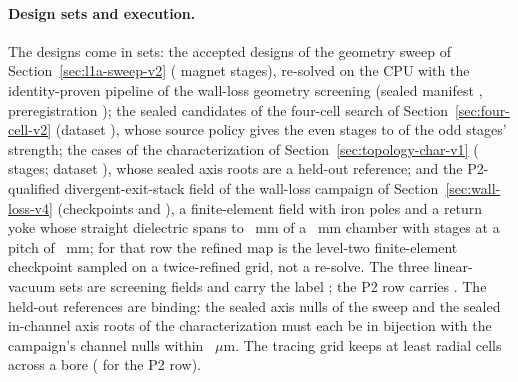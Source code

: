 \paragraph{Design sets and execution.}
The \CtvDesignCount{} designs come in \CtvSetCount{} sets: the
\CtvSweepCount{} accepted designs of the geometry sweep of
Section~\ref{sec:l1a-sweep-v2} (\CtvSweepStages{} magnet stages), re-solved on
the CPU with the identity-proven pipeline of the wall-loss geometry screening
(sealed manifest \texttt{\CtvSweepManifestSha}, preregistration
\texttt{\CtvSweepPreregCommit}); the \CtvFourCellCount{} sealed candidates of
the four-cell search of Section~\ref{sec:four-cell-v2} (dataset
\texttt{\CtvFourCellDatasetSha}), whose source policy gives the even stages
\CtvFourCellStrengthRatioMin{} to \CtvFourCellStrengthRatioMax{} of the odd
stages' strength; the \CtvCharVCount{} cases of the characterization of
Section~\ref{sec:topology-char-v1} (\CtvCharVStages{} stages; dataset
\texttt{\CtvCharVDatasetSha}), whose sealed axis roots are a held-out
reference; and the P2-qualified divergent-exit-stack field of the wall-loss
campaign of Section~\ref{sec:wall-loss-v4} (checkpoints
\texttt{\CtvPTwoPrimaryCheckpointSha} and \texttt{\CtvPTwoRefinedCheckpointSha}),
a finite-element field with iron poles and a return yoke whose straight
dielectric spans \CtvPTwoStraightStartMm{} to \CtvPTwoStraightEndMm{}~mm of a
\CtvPTwoChamberLengthMm{}~mm chamber with \CtvPTwoStages{} stages at a pitch of
\CtvPTwoPitchMm{}~mm; for that row the refined map is the level-two
finite-element checkpoint sampled on a twice-refined grid, not a re-solve. The
three linear-vacuum sets are \CtvFieldModelLevel{} screening fields and carry
the label \texttt{\CtvClassification}; the P2 row carries
\texttt{\CtvPTwoClassification}. The held-out references are binding: the
sealed axis nulls of the sweep and the sealed in-channel axis roots of the
characterization must each be in bijection with the campaign's channel nulls
within \CtvHeldOutToleranceUm{}~$\mu$m. The tracing grid keeps at least
\CtvSweepRadialCellsMin{} radial cells across a bore (\CtvPTwoRadialCells{} for
the P2 row).

